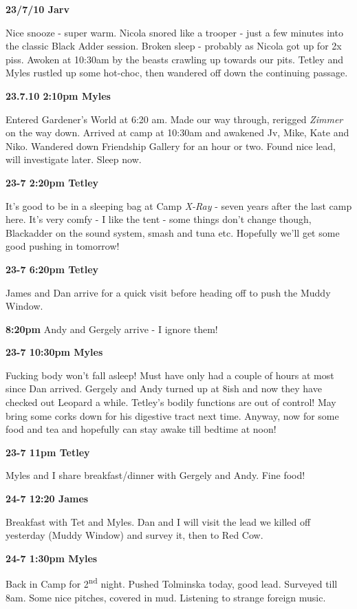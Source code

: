 \textbf{23/7/10 Jarv}

Nice snooze - super warm. Nicola snored like a trooper - just a few
minutes into the classic Black Adder session. Broken sleep - probably as
Nicola got up for 2x piss. Awoken at 10:30am by the beasts crawling up
towards our pits. Tetley and Myles rustled up some hot-choc, then
wandered off down the continuing passage.

\textbf{23.7.10 2:10pm Myles}

Entered Gardener's World at 6:20 am. Made our way through, rerigged
\emph{Zimmer} on the way down. Arrived at camp at 10:30am and awakened
Jv, Mike, Kate and Niko. Wandered down Friendship Gallery for an hour or
two. Found nice lead, will investigate later. Sleep now.

\textbf{23-7 2:20pm Tetley}

It's good to be in a sleeping bag at Camp \emph{X-Ray} - seven years
after the last camp here. It's very comfy - I like the tent - some
things don't change though, Blackadder on the sound system, smash and
tuna etc. Hopefully we'll get some good pushing in tomorrow!

\textbf{23-7 6:20pm Tetley}

James and Dan arrive for a quick visit before heading off to push the
Muddy Window.

\textbf{8:20pm} Andy and Gergely arrive - I ignore them!

\textbf{23-7 10:30pm Myles}

Fucking body won't fall asleep! Must have only had a couple of hours at
most since Dan arrived. Gergely and Andy turned up at 8ish and now they
have checked out Leopard a while. Tetley's bodily functions are out of
control! May bring some corks down for his digestive tract next time.
Anyway, now for some food and tea and hopefully can stay awake till
bedtime at noon!

\textbf{23-7 11pm Tetley}

Myles and I share breakfast/dinner with Gergely and Andy. Fine food!

\textbf{24-7 12:20 James}

Breakfast with Tet and Myles. Dan and I will visit the lead we killed
off yesterday (Muddy Window) and survey it, then to Red Cow.

\textbf{24-7 1:30pm Myles}

Back in Camp for 2\textsuperscript{nd} night. Pushed Tolminska today,
good lead. Surveyed till 8am. Some nice pitches, covered in mud.
Listening to strange foreign music.

